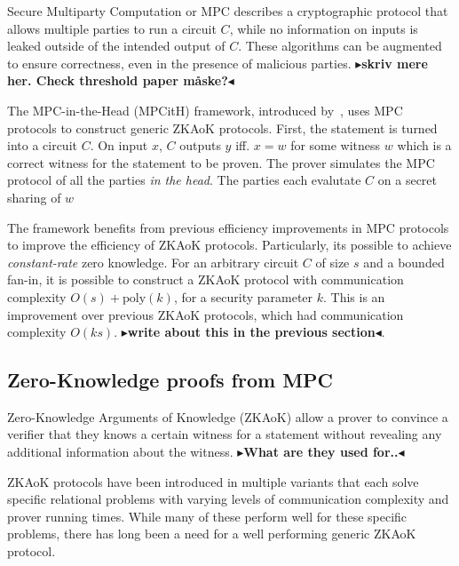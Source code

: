 \documentclass[twoside,11pt,openright]{report}
\theoremstyle{definition}
\theoremstyle{plain}
\newcommand{\todo}[1]{{\color[rgb]{.5,0,0}\textbf{$\blacktriangleright$#1$\blacktriangleleft$}}}
\begin{document}
Secure Multiparty Computation or MPC describes a cryptographic protocol that allows multiple parties to run a circuit $C$, while no information on inputs is leaked outside of the intended output of $C$. These algorithms can be augmented to ensure correctness, even in the presence of malicious parties. \todo{skriv mere her. Check threshold paper måske?}

The MPC-in-the-Head (MPCitH) framework, introduced by~\cite{ishai2007zero}, uses MPC protocols to construct generic ZKAoK protocols. First, the statement is turned into a circuit $C$. On input $x$, $C$ outputs $y$ iff. $x = w$ for some witness $w$ which is a correct witness for the statement to be proven. The prover simulates the MPC protocol of all the parties \textit{in the head}. The parties each evalutate $C$ on a secret sharing of $w$

The framework benefits from previous efficiency improvements in MPC protocols to improve the efficiency of ZKAoK protocols. Particularly, its possible to achieve \textit{constant-rate} zero knowledge. For an arbitrary circuit $C$ of size $s$ and a bounded fan-in, it is possible to construct a ZKAoK protocol with communication complexity $O(s) + \text{poly}(k)$, for a security parameter $k$. This is an improvement over previous ZKAoK protocols, which had communication complexity $O(ks)$. \todo{write about this in the previous section}.

\subsection{Zero-Knowledge proofs from MPC}
\label{sec:zkmpc}

Zero-Knowledge Arguments of Knowledge (ZKAoK) allow a prover to convince a verifier that they knows a certain witness for a statement without revealing any additional information about the witness. \todo{What are they used for..}

ZKAoK protocols have been introduced in multiple variants that each solve specific relational problems with varying levels of communication complexity and prover running times. While many of these perform well for these specific problems, there has long been a need for a well performing generic ZKAoK protocol.
\end{document}
